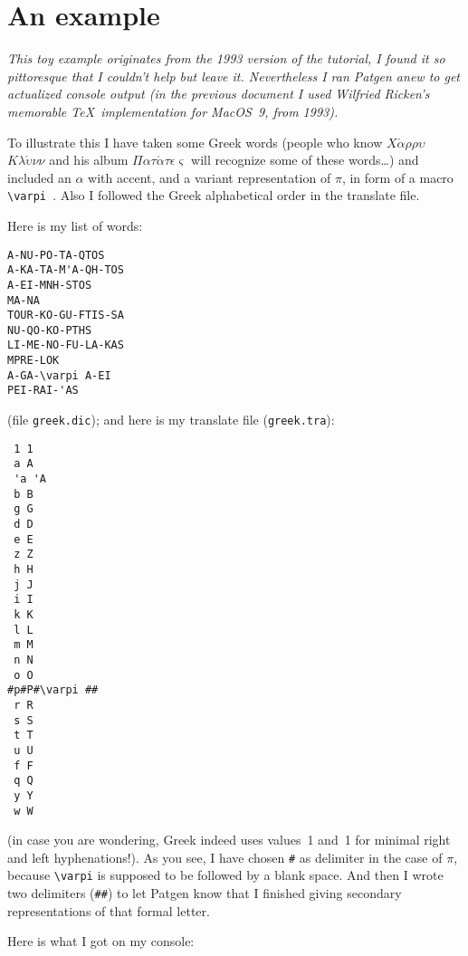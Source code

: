 \documentclass{article}
\begin{document}
\section{An example}
\emph{This toy example originates from the 1993 version of the tutorial, I found it so pittoresque that I couldn't help but leave it. Nevertheless I ran Patgen anew to get actualized console output (in the previous document I used Wilfried Ricken's memorable \TeX\ implementation for MacOS~9, from 1993).}

To illustrate this I have taken some
Greek words (people who know $X\acute\alpha%
\rho\rho\upsilon$ $K\lambda\acute\upsilon\nu\nu$
and his album $\Pi\alpha\tau%
\acute\alpha\tau\epsilon\varsigma$ will recognize some of these
words\ldots) and included an $\alpha$ with accent, and a variant
representation of $\pi$, in form of a macro \verb*=\varpi =. Also I
followed the Greek alphabetical order in the translate file.

Here is my list of words:
\begin{verbatim}
A-NU-PO-TA-QTOS
A-KA-TA-M'A-QH-TOS
A-EI-MNH-STOS
MA-NA
TOUR-KO-GU-FTIS-SA
NU-QO-KO-PTHS
LI-ME-NO-FU-LA-KAS
MPRE-LOK
A-GA-\varpi A-EI
PEI-RAI-'AS
\end{verbatim}
(file {\tt greek.dic}); and here is my translate file ({\tt greek.tra}):
\begin{verbatim}
 1 1
 a A
 'a 'A
 b B
 g G
 d D
 e E
 z Z
 h H
 j J
 i I
 k K
 l L
 m M
 n N
 o O
#p#P#\varpi ##
 r R
 s S
 t T
 u U
 f F
 q Q
 y Y
 w W
\end{verbatim}
(in case you are wondering, Greek indeed uses values~1
and~1 for minimal right
and left hyphenations!). As you see, I have chosen \verb=#= as delimiter
in the case of $\pi$, because \verb=\varpi= is supposed to be followed
by a blank space. And then I wrote two delimiters (\verb=##=) to let Patgen know
that I finished giving secondary representations of that formal letter.

Here is what I got on my console:
\end{document}
